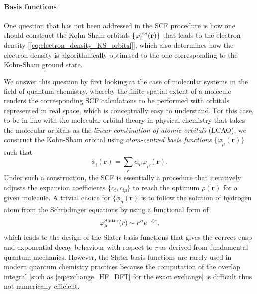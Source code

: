 \paragraph{\textbf{Basis functions}} One question that has not been addressed in the SCF procedure is how one should construct the Kohn-Sham orbitals $\{\varphi^{\mbox{\scriptsize{KS}}}_i(\mathbf{r})\}$ that leads to the electron density [\cref{eq:electron_density_KS_orbital}], which also determines how the electron density is algorithmically optimised to the one corresponding to the Kohn-Sham ground state. 

We answer this question by first looking at the case of molecular systems in the field of quantum chemistry, whereby the finite spatial extent of a molecule renders the corresponding SCF calculations to be performed with orbitals represented in real space, which is conceptually easy to understand. For this case, to be in line with the molecular orbital theory in physical chemistry that takes the molecular orbitals as the \emph{linear combination of atomic orbitals} (LCAO), we construct the Kohn-Sham orbital using \emph{atom-centred basis functions} $\{\varphi_{\mu}(\bm{r})\}$ such that 
\begin{equation}
\label{eq:molecular_basis_func_expansion}
\phi_i(\bm{r})=\sum_{\mu}c_{i\mu}\varphi_{\mu}(\bm{r}).
\end{equation}
Under such a construction, the SCF is essentially a procedure that iteratively adjusts the expansion coefficients $\{c_i,c_{i\mu}\}$ to reach the optimum $\rho(\bm{r})$ for a given molecule. A trivial choice for $\{\phi_{\mu}(\bm{r})$ is to follow the solution of hydrogen atom from the Schr\"{o}dinger equations by using a functional form of 
\begin{equation}
\varphi_{\mu}^{\mbox{{\scriptsize{Slater}}}}(r)\sim r^n e^{-\zeta r},
\end{equation}
which leads to the design of the Slater basis functions\cite{slater1930atomic} that gives the correct cusp and exponential decay behaviour with respect to $r$ as derived from fundamental quantum mechanics. However, the Slater basis functions are rarely used in modern quantum chemistry practices because the computation of the overlap integral [such as \cref{eq:exchange_HF_DFT}
 for the exact exchange] is difficult thus not numerically efficient. 

